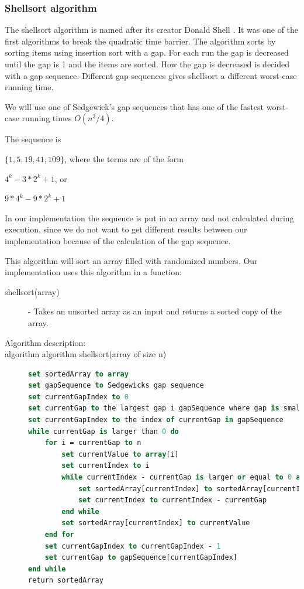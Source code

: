 \documentclass {article}
\begin{document}
\subsubsection{Shellsort algorithm}
The shellsort algorithm is named after its creator Donald Shell \cite{weiss}. It was one of the first algorithms to break the quadratic time barrier. The algorithm sorts by sorting items using insertion sort with a gap. For each run the gap is decreased until the gap is 1 and the items are sorted. How the gap is decreased is decided with a gap sequence. Different gap sequences gives shellsort a different worst-case running time.
 
We will use one of Sedgewick's gap sequences that has one of the fastest worst-case running times \(O(n^3/4)\). 

The sequence is 

\(\{1, 5, 19, 41, 109\}\), where the terms are of the form

\(4^k - 3 * 2^k + 1\), or

\(9 * 4^k - 9 * 2^k + 1\)
 
In our implementation the sequence is put in an array and not calculated during execution, since we do not want to get different results between our implementation because of the calculation of the gap sequence.

This algorithm will sort an array filled with randomized numbers. Our implementation uses this algorithm in a function:

\begin{description}
\item[shellsort(array)] - Takes an unsorted array as an input and returns a sorted copy of the array.

\item[Algorithm description:]
\item[algorithm algorithm shellsort(array of size n)]
\item []
\begin{lstlisting}[language=Pascal]
set sortedArray to array
set gapSequence to Sedgewicks gap sequence
set currentGapIndex to 0
set currentGap to the largest gap i gapSequence where gap is smaller than n divided by 2
set currentGapIndex to the index of currentGap in gapSequence
while currentGap is larger than 0 do
 	for i = currentGap to n
 		set currentValue to array[i]
 		set currentIndex to i
 		while currentIndex - currentGap is larger or equal to 0 and sortedArray[currentIndex - currentGap] is larger than currentValue do
 			set sortedArray[currentIndex] to sortedArray[currentIndex - currentGap]
 			set currentIndex to currentIndex - currentGap
 		end while
 		set sortedArray[currentIndex] to currentValue
 	end for
 	set currentGapIndex to currentGapIndex - 1
 	set currentGap to gapSequence[currentGapIndex]
end while
return sortedArray
\end{lstlisting}
\end{description}
\end{document}
